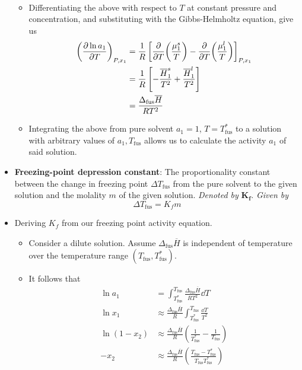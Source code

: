 \documentclass[../notes.tex]{subfiles}
\begin{document}
\begin{itemize}
\begin{itemize}
\begin{align*}
        \end{align*}
        \item Differentiating the above with respect to $T$ at constant pressure and concentration, and substituting with the Gibbs-Helmholtz equation, give us
        \begin{align*}
            \left( \pdv{\ln a_1}{T} \right)_{P,x_1} &= \frac{1}{R}\left[ \pdv{T}(\frac{\mu_1^s}{T})-\pdv{T}(\frac{\mu_1^l}{T}) \right]_{P,x_1}\\
            &= \frac{1}{R}\left[ -\frac{\overline{H}_1^s}{T^2}+\frac{\overline{H}_1^l}{T^2} \right]\\
            &= \frac{\Delta_\text{fus}\overline{H}}{RT^2}
        \end{align*}
        \item Integrating the above from pure solvent $a_1=1$, $T=T_\text{fus}^*$ to a solution with arbitrary values of $a_1,T_\text{fus}$ allows us to calculate the activity $a_1$ of said solution.
    \end{itemize}
    \item \textbf{Freezing-point depression constant}: The proportionality constant between the change in freezing point $\Delta T_\text{fus}$ from the pure solvent to the given solution and the molality $m$ of the given solution. \emph{Denoted by} $\bm{K_f}$. \emph{Given by}
    \begin{equation*}
        \Delta T_\text{fus} = K_fm
    \end{equation*}
    \item Deriving $K_f$ from our freezing point activity equation.
    \begin{itemize}
        \item Consider a dilute solution. Assume $\Delta_\text{fus}\overline{H}$ is independent of temperature over the temperature range $(T_\text{fus},T_\text{fus}^*)$.
        \item It follows that
        \begin{align*}
            \ln a_1 &= \int_{T_\text{fus}^*}^{T_\text{fus}}\frac{\Delta_\text{fus}\overline{H}}{RT^2}\dd{T}\\
            \ln x_1 &\approx \frac{\Delta_\text{fus}\overline{H}}{R}\int_{T_\text{fus}^*}^{T_\text{fus}}\frac{\dd{T}}{T^2}\\
            \ln(1-x_2) &\approx \frac{\Delta_\text{fus}\overline{H}}{R}\left( \frac{1}{T_\text{fus}^*}-\frac{1}{T_\text{fus}} \right)\\
            -x_2 &\approx \frac{\Delta_\text{fus}\overline{H}}{R}\left( \frac{T_\text{fus}-T_\text{fus}^*}{T_\text{fus}T_\text{fus}^*} \right)

\end{align*}
\end{itemize}
\end{itemize}
\end{document}

